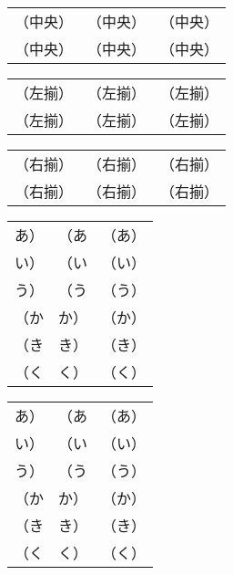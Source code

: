 \documentclass[twocolumn]{tarticle}
\begin{document}
\begin{tabular}{|c|c|c|}
\mbox{（中央）} & \mbox{（中央）} & \mbox{（中央）} \\
\mbox{（中央）} & \mbox{（中央）} & \mbox{（中央）}
\end{tabular}

\begin{tabular}{|l|l|l|}
\mbox{（左揃）} & \mbox{（左揃）} & \mbox{（左揃）} \\
\mbox{（左揃）} & \mbox{（左揃）} & \mbox{（左揃）}
\end{tabular}

\begin{tabular}{|r|r|r|}
\mbox{（右揃）} & \mbox{（右揃）} & \mbox{（右揃）} \\
\mbox{（右揃）} & \mbox{（右揃）} & \mbox{（右揃）}
\end{tabular}

\newpage


\begin{tabular}{|p{}|p{}|p{}|}
あ） & （あ & （あ） \\    %
い）\<&\<（い&\<（い）\<\\ %
う）&（う&（う）\\         %
（か & か） & （か） \\    %
（き\<&\<き）&\<（き）\<\\ %
（く&く）&（く）\\         %
\end{tabular}


\begin{tabular}{|p{}|p{}|p{}|}
\mbox{あ）} & \mbox{（あ} & \mbox{（あ）} \\
\mbox{い）}\<&\<\mbox{（い}&\<\mbox{（い）}\<\\
\mbox{う）}&\mbox{（う}&\mbox{（う）}\\
\mbox{（か} & \mbox{か）} & \mbox{（か）} \\
\mbox{（き}\<&\<\mbox{き）}&\<\mbox{（き）}\<\\
\mbox{（く}&\mbox{く）}&\mbox{（く）}\\
\end{tabular}
\end{document}
